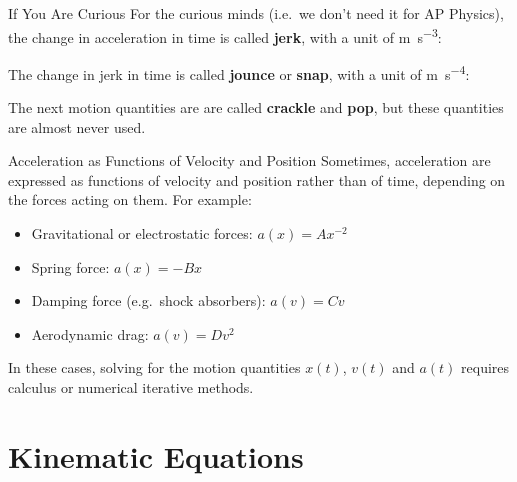 \documentclass[12pt,compress,aspectratio=169]{beamer}
\newcommand{\mb}[1]{\ensuremath\mathbf{#1}}
\newcommand{\eq}[2]{\vspace{#1}{\Large\begin{displaymath}#2\end{displaymath}}}
\begin{document}
\begin{frame}{If You Are Curious}
  For the curious minds (i.e.\ we don't need it for AP Physics), the change in
  acceleration in time is called \textbf{jerk}, with a unit of
  \si{\metre\per\second^3}:

  \eq{-.2in}{
    \overline{\mb{j}}= \frac{\Delta\mb{a}}{\Delta t}
  }

  The change in jerk in time is called \textbf{jounce} or \textbf{snap}, with a
  unit of \si{\metre\per\second^4}:
  
  \eq{-.2in}{
    \overline{\mb{s}}=\frac{\Delta\mb{j}}{\Delta t}
  }
  
  The next motion quantities are are called \textbf{crackle} and \textbf{pop},
  but these quantities are almost never used.
\end{frame}



\begin{frame}{Acceleration as Functions of Velocity and Position}
  Sometimes, acceleration are expressed as functions of velocity and position
  rather than of time, depending on the forces acting on them. For example:
  \begin{itemize}
  \item Gravitational or electrostatic forces: $a(x)=Ax^{-2}$
  \item Spring force: $\displaystyle a(x)=-Bx$
  \item Damping force (e.g.\ shock absorbers): $a(v)=Cv$
  \item Aerodynamic drag: $a(v)=Dv^2$
  \end{itemize}
  In these cases, solving for the motion quantities $x(t)$, $v(t)$ and $a(t)$
  requires calculus or numerical iterative methods.
\end{frame}



\section{Kinematic Equations}
\end{document}
